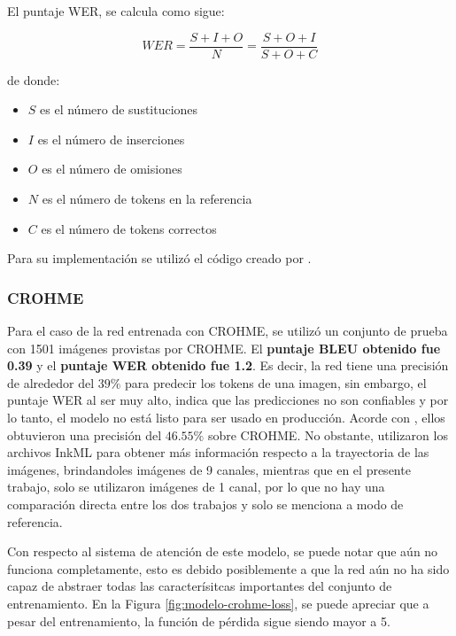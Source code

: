 El puntaje WER, se calcula como sigue:

\begin{equation}
    WER = \frac{S + I + O}{N} = \frac{S + O + I}{S + O + C}
\end{equation}

de donde:

\begin{itemize}
    \item $S$ es el número de sustituciones
    \item $I$ es el número de inserciones
    \item $O$ es el número de omisiones
    \item $N$ es el número de tokens en la referencia
    \item $C$ es el número de tokens correctos
\end{itemize}

Para su implementación se utilizó el código creado por \cite{wer-implementation}.

\subsubsection{CROHME}

Para el caso de la red entrenada con CROHME, se utilizó un conjunto de prueba con 1501 imágenes provistas por CROHME. El \textbf{puntaje BLEU obtenido fue 0.39} y el \textbf{puntaje WER obtenido fue 1.2}. Es decir, la red tiene una precisión de alrededor del $39\%$ para predecir los tokens de una imagen, sin embargo, el puntaje WER al ser muy alto, indica que las predicciones no son confiables y por lo tanto, el modelo no está listo para ser usado en producción. Acorde con \cite{chino}, ellos obtuvieron una precisión del $46.55\%$ sobre CROHME. No obstante, utilizaron los archivos InkML para obtener más información respecto a la trayectoria de las imágenes, brindandoles imágenes de 9 canales, mientras que en el presente trabajo, solo se utilizaron imágenes de 1 canal, por lo que no hay una comparación directa entre los dos trabajos y solo se menciona a modo de referencia.

Con respecto al sistema de atención de este modelo, se puede notar que aún no funciona completamente, esto es debido posiblemente a que la red aún no ha sido capaz de abstraer todas las caracterísitcas importantes del conjunto de entrenamiento. En la Figura \ref{fig:modelo-crohme-loss}, se puede apreciar que a pesar del entrenamiento, la función de pérdida sigue siendo mayor a 5.

